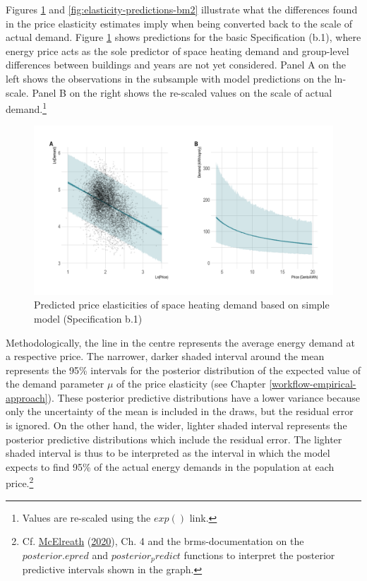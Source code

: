 \documentclass[12pt,twoside]{reedthesis}
\begin{document}
Figures \ref{fig:elasticity-predictions-b1} and \ref{fig:elasticity-predictions-bm2} illustrate what the differences found in the price elasticity estimates imply when being converted back to the scale of actual demand. Figure \ref{fig:elasticity-predictions-b1} shows predictions for the basic Specification (b.1), where energy price acts as the sole predictor of space heating demand and group-level differences between buildings and years are not yet considered. Panel A on the left shows the observations in the subsample with model predictions on the ln-scale. Panel B on the right shows the re-scaled values on the scale of actual demand.\footnote{Values are re-scaled using the \(exp()\) link.}
\begin{figure}

{\centering \includegraphics[width=1\linewidth]{figure/b1_prediction} 

}

\caption{Predicted price elasticities of space heating demand based on simple model (Specification b.1)}\label{fig:elasticity-predictions-b1}
\end{figure}
Methodologically, the line in the centre represents the average energy demand at a respective price. The narrower, darker shaded interval around the mean represents the 95\% intervals for the posterior distribution of the expected value of the demand parameter \(\mu\) of the price elasticity (see Chapter \ref{workflow-empirical-approach}). These posterior predictive distributions have a lower variance because only the uncertainty of the mean is included in the draws, but the residual error is ignored. On the other hand, the wider, lighter shaded interval represents the posterior predictive distributions which include the residual error. The lighter shaded interval is thus to be interpreted as the interval in which the model expects to find 95\% of the actual energy demands in the population at each price.\footnote{Cf. \protect\hyperlink{ref-mcelreath20}{McElreath} (\protect\hyperlink{ref-mcelreath20}{2020}), Ch. 4 and the brms-documentation on the \(posterior.epred\) and \(posterior_predict\) functions to interpret the posterior predictive intervals shown in the graph.}
\end{document}
